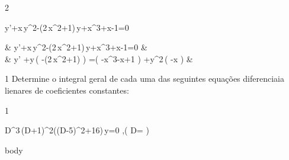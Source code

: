 \documentclass["./AM3C.exercises_resolutions.2024.tex"]{subfiles}
\begin{document}
\setcounter{question}{10}
\setcounter{subquestion}{1}

\begin{questionBox}2{ %
	\begin{BM}
		y'+x\,y^2-(2\,x^2+1)\,y+x^3+x-1=0
	\end{BM}
	} %
	\answer{}
	\begin{flalign*}
		         &
		y'+x\,y^2-(2\,x^2+1)\,y+x^3+x-1=0
		\implies & \\&
		\implies
		y'
		+y\,\left(
		-(2\,x^2+1)
		\right)
		=\left(
		-x^3-x+1
		\right)
		+y^2\,\left(
		-x
		\right)
		         &
	\end{flalign*}

\end{questionBox}

\setcounter{question}{13}

\begin{questionBox}1{ %
	Determine o integral geral de cada uma das seguintes equações diferenciaia lienares de coeficientes constantes:
	} %
\end{questionBox}
\begin{questionBox}1{ %
	\begin{BM}
		D^3\,(D+1)^2((D-5)^2+16)\,y=0
		,\quad\left(
		 D=
		\right)
	\end{BM}
	} %
	body
\end{questionBox}
\end{document}
